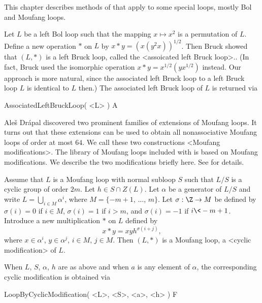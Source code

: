 
This chapter describes methods of {\LOOPS} that apply to some special loops,
mostly Bol and Moufang loops.


Let $L$ be a left Bol loop such that the mapping $x\mapsto
x^2$ is a permutation of $L$. Define a new operation $*$ on $L$ by $x*y
=(x(y^2x))^{1/2}$. Then Bruck showed that $(L,*)$ is a left Bruck loop, called
the <assoicated left Bruck loop>.. (In fact,
Bruck used the isomorphic operation $x*y = x^{1/2}(yx^{1/2})$ instead. Our
approach is more natural, since the associated left Bruck loop to a left Bruck
loop $L$ is identical to $L$ then.) The associated left Bruck loop of $L$ is
returned via

\>AssociatedLeftBruckLoop( <L> ) A



Ale\v{s} Dr\'apal discovered two prominent families of extensions of Moufang
loops. It turns out that these extensions can be used to obtain all
nonassociative Moufang loops of order at most $64$. We call these two
constructions <Moufang modifications>. The library
of Moufang loops included with {\LOOPS} is based on Moufang modifications. We
describe the two modifications briefly here. See \cite{DrVo} for details.

Assume that $L$ is a Moufang loop with normal subloop $S$ such that $L/S$ is a
cyclic group of order $2m$. Let $h\in S\cap Z(L)$. Let $\alpha$ be a generator
of $L/S$ and write $L = \bigcup_{i\in M} \alpha^i$, where $M=\{-m+1$, $\dots$,
$m\}$. Let $\sigma:\Z\to M$ be defined by $\sigma(i)=0$ if $i\in M$,
$\sigma(i)=1$ if $i>m$, and $\sigma(i)=-1$ if $i\<-m+1$. Introduce a new
multiplication $\ast$ on $L$ defined by
$$
    x\ast y = xyh^{\sigma(i+j)},
$$
where $x\in \alpha^i$, $y\in\alpha^j$, $i\in M$, $j\in M$. Then $(L,\ast)$ is a
Moufang loop, a <cyclic modification> of $L$.

When $L$, $S$, $\alpha$, $h$ are as above and when $a$ is any element of
$\alpha$, the corresponding cyclic modification is obtained via

\>LoopByCyclicModification( <L>, <S>, <a>, <h> ) F

